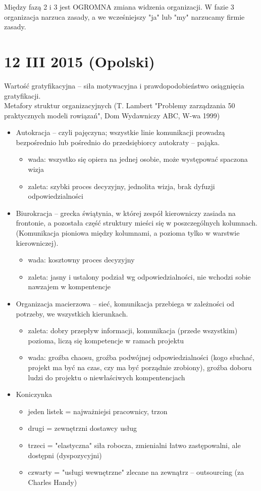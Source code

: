 \documentclass[a4paper,10pt]{report}
\begin{document}
Między fazą 2 i 3 jest OGROMNA zmiana widzenia organizacji. W fazie 3 organizacja narzuca zasady, a we wcześniejszy "ja" lub "my" narzucamy firmie zasady.

\section{12 III 2015 (Opolski)}

Wartość gratyfikacyjna -- siła motywacyjna i prawdopodobieństwo osiągnięcia gratyfikacji.\\


\noindent Metafory struktur organizacyjnych (T. Lambert "Problemy zarządzania 50 praktycznych modeli rowiązań", Dom Wydawniczy ABC, W-wa 1999)
\begin{itemize}
	\item Autokracja -- czyli pajęczyna; wszystkie linie komunikacji prowadzą bezpośrednio lub pośrednio do przedsiębiorcy autokraty -- pająka. 
	\begin{itemize}
		\item wada: wszystko się opiera na jednej osobie, może występować spaczona wizja
		\item zaleta: szybki proces decyzyjny, jednolita wizja, brak dyfuzji odpowiedzialności
	\end{itemize}
	\item Biurokracja -- grecka świątynia, w której zespół kierowniczy zasiada na frontonie, a pozostała część struktury mieści się w poszczególnych kolumnach. (Komunikacja pioniowa między kolumnami, a pozioma tylko w warstwie kierowniczej).
	\begin{itemize}
		\item wada: kosztowny proces decyzyjny
		\item zaleta: jasny i ustalony podział wg odpowiedzialności, nie wchodzi sobie nawzajem w kompentencje
	\end{itemize}
	\item Organizacja macierzowa -- sieć, komunikacja przebiega w zależności od potrzeby, we wszystkich kierunkach.
	\begin{itemize}
		\item zaleta: dobry przepływ informacji, komunikacja (przede wszystkim) pozioma, liczą się kompetencje w ramach projektu
		\item wada: groźba chaosu, groźba podwójnej odpowiedzialności (kogo słuchać, projekt ma być na czas, czy ma być porządnie zrobiony), groźba doboru ludzi do projektu o niewłaściwych kompentencjach
	\end{itemize}
	\item Koniczynka
	\begin{itemize}
		\item jeden listek = najważniejsi pracownicy, trzon
		\item drugi = zewnętrzni dostawcy usług
		\item trzeci = "elastyczna" siła robocza, zmienialni łatwo zastępowalni, ale dostępni (dyspozycyjni)
		\item czwarty = "usługi wewnętrzne" zlecane na zewnątrz -- outsourcing (za Charles Handy)
	\end{itemize}
\end{itemize}
\end{document}
